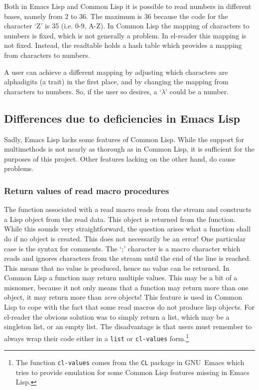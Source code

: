 \documentclass[a4paper,10pt,twoside]{report}
\newcommand{\el}{Emacs Lisp}
\newcommand{\cl}{Common Lisp}
\newcommand{\elr}{el-reader}
\newcommand{\sym}[1]{\texttt{#1}}
\newcommand{\fun}[1]{\texttt{#1}}
\newcommand{\emacs}{GNU~Emacs}
\begin{document}
Both in \el{} and \cl{} it is possible to read numbers in different bases,
namely from 2 to 36.  The maximum is 36 because the code for the character ‘Z’
is 35 (i.e. 0-9, A-Z).  In \cl{} the mapping of characters to numbers is fixed,
which is not generally a problem.  In \elr{} this mapping is not fixed.
Instead, the readtable holds a hash table which provides a mapping from
characters to numbers.

A user can achieve a different mapping by adjusting which characters are
alphadigits (a trait) in the first place, and by changing the mapping from
characters to numbers.  So, if the user so desires, a ‘\(\lambda{}\)’ could be a
number.

\subsection{Differences due to deficiencies in \el{}}
\label{subsec:deficiency-diffs}

Sadly, \el{} lacks some features of \cl{}.  While the support for multimethods
is not nearly as thorough as in \cl{}, it is sufficient for the purposes of this
project.  Other features lacking on the other hand, do cause problems.

\subsubsection{Return values of read macro procedures}
\label{subsubsec:ret-vals}

The function associated with a read macro reads from the stream and constructs a
Lisp object from the read data.  This object is returned from the function.
While this sounds very straightforward, the question arises what a function
shall do if no object is created.  This does not necessarily be an error!  One
particular case is the syntax for comments.  The ‘;’ character is a macro
character which reads and ignores characters from the stream until the end of
the line is reached.  This means that no value is produced, hence no value can
be returned.  In \cl{} a function may return multiple values.  This may be a bit
of a misnomer, because it not only means that a function may return more than
one object, it may return more than \emph{zero} objects!  This feature is used
in \cl{} to cope with the fact that some read macros do not produce lisp
objects.  For \elr{} the obvious solution was to simply return a list, which may
be a singleton list, or an empty list.  The disadvantage is that users must
remember to always wrap their code either in a \fun{list} or \fun{cl-values}
form.\footnote{The function \fun{cl-values} comes from the \sym{CL} package in
  \emacs{} which tries to provide emulation for some \cl{} features missing in
  \el{}.}
\end{document}

